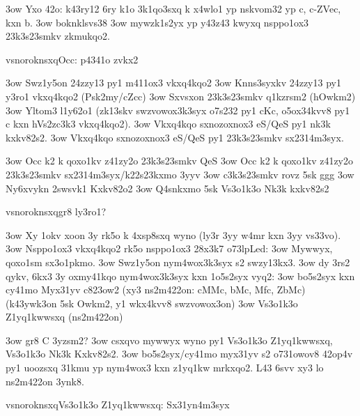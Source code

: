 \s3ow Yxo 42o: k43ry12 6ry k1o 3k1qo3sxq k x4wlo1 yp nskvom32 yp c,
  c-ZVec, kxn b.
\s3ow boknklsvs38
\s3ow mywzk1s2yx yp y43z43 kwyxq nsppo1ox3 23k3s23smkv zkmukqo2.

  




  \2vsnoroknsxq{Occ: p4341o zvkx2}

  \s3ow Swz1y5on 24zzy13 py1 m411ox3 vkxq4kqo2
  \s3ow Knns3syxkv 24zzy13 py1 y3ro1 vkxq4kqo2 (Psk2my/cZcc)
  \s3ow Sxvsxon 23k3s23smkv q1kzrsm2 (hOwkm2)
  \s3ow Yltom3 l1y62o1 (zk13skv swzvowox3k3syx o7s232 py1 cKc,
    o5ox34kvv8 py1 c kxn hVs2zc3k3 vkxq4kqo2).
  \s3ow Vkxq4kqo sxnozoxnox3 eS/QeS py1 nk3k kxkv82s2.
  \s3ow Vkxq4kqo sxnozoxnox3 eS/QeS py1 23k3s23smkv sx2314m3syx.

\s3ow Occ k2 k qoxo1kv z41zy2o 23k3s23smkv QeS
\s3ow Occ k2 k qoxo1kv z41zy2o 23k3s23smkv sx2314m3syx/k22s23kxmo 3yyv 
  \s3ow c3k3s23smkv rovz 5sk ggg
  \s3ow Ny6xvykn 2swsvk1 Kxkv82o2
  \s3ow Q4snkxmo 5sk Vs3o1k3o Nk3k kxkv82s2


  \2vsnoroknsxq{gr8 ly3ro1?}

  \s3ow Xy 1okv xoon 3y rk5o k 4xsp8sxq wyno (ly3r 3yy w4mr kxn 3yy
    vs33vo). 
  \s3ow Nsppo1ox3 vkxq4kqo2 rk5o nsppo1ox3 28x3k7
  \3o73lp{Led:}
  \s3ow Mywwyx, qoxo1sm sx3o1pkmo.
  \s3ow Swz1y5on nym4wox3k3syx s2 swzy13kx3.
  \s3ow dy 3rs2 qykv, 6kx3 3y oxmy41kqo nym4wox3k3syx kxn 1o5s2syx
    vyq2:
    \s3ow bo5s2syx kxn cy41mo Myx31yv c823ow2 (xy3 ns2m422on: cMMc,
      bMc, Mfc, ZbMc) (k43ywk3on 5sk Owkm2, y1 wkx4kvv8 swzvowox3on)
    \s3ow Vs3o1k3o Z1yq1kwwsxq (ns2m422on)

\s3ow gr8 C 3yzsm2?
\s3ow csxqvo mywwyx wyno py1 Vs3o1k3o Z1yq1kwwsxq, Vs3o1k3o Nk3k
  Kxkv82s2.
\s3ow bo5s2syx/cy41mo myx31yv s2 o731owov8 42op4v py1 uoozsxq 31kmu yp
  nym4wox3 kxn z1yq1kw mrkxqo2.  L43 6svv xy3 lo ns2m422on 3ynk8.

  \2vsnoroknsxq{Vs3o1k3o Z1yq1kwwsxq: Sx31yn4m3syx}

